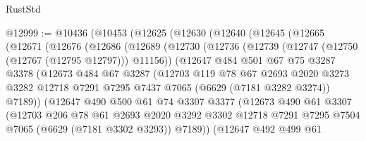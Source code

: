 \begin{lexlean}{RustStd}
\begin{coremodule}
@12999 := @10436
    (@10453
      (@12625
        (@12630
          (@12640
            (@12645
              (@12665
                (@12671
                  (@12676
                    (@12686
                      (@12689
                        (@12730
                          (@12736
                            (@12739 (@12747 (@12750 (@12767 (@12795 @12797))) @11156))
                            (@12647
                              @484
                              @501
                              @67
                              @75
                              @3287
                              @3378
                              (@12673
                                @484
                                @67
                                @3287
                                (@12703
                                  @119
                                  @78
                                  @67
                                  @2693
                                  @2020
                                  @3273
                                  @3282
                                  @12718
                                  @7291
                                  @7295
                                  @7437
                                  @7065
                                  (@6629 (@7181 @3282 @3274))
                                  @7189))
                              (@12647
                                @490
                                @500
                                @61
                                @74
                                @3307
                                @3377
                                (@12673
                                  @490
                                  @61
                                  @3307
                                  (@12703
                                    @206
                                    @78
                                    @61
                                    @2693
                                    @2020
                                    @3292
                                    @3302
                                    @12718
                                    @7291
                                    @7295
                                    @7504
                                    @7065
                                    (@6629 (@7181 @3302 @3293))
                                    @7189))
                                (@12647
                                  @492
                                  @499
                                  @61

\end{coremodule}
\end{lexlean}
